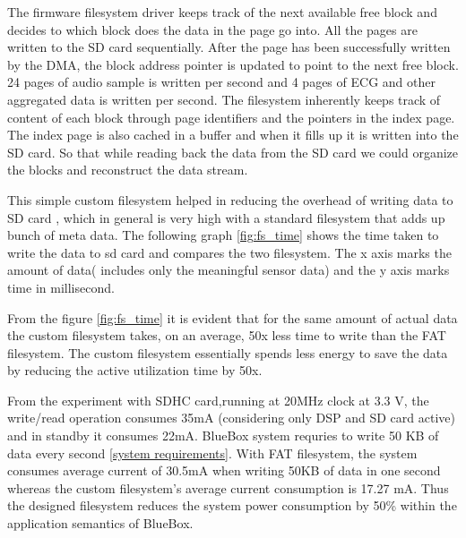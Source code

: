 The firmware filesystem driver keeps track of the next available free block and decides to which block does the data in the page go into. All the pages are written to the SD card sequentially. After the page has been successfully written by the DMA, the block address pointer is updated to point to the next free block.  24 pages of audio sample is written per second and 4 pages of ECG and other aggregated data is written per second.  
The filesystem inherently keeps track of content of each block through page identifiers and the pointers in the index page. The index page is also cached in a buffer and when it fills up it is written into the SD card. So that while reading back the data from the SD card we could organize the blocks and reconstruct the data stream.  

This simple custom filesystem  helped in reducing the overhead of writing data to SD card , which in general is very high with a standard filesystem that adds up bunch of meta data. The following graph \ref{fig:fs_time} shows the time taken to write the data to sd card and compares the two filesystem. The x axis marks the amount of data( includes only the meaningful sensor data)  and the y axis marks time in millisecond.
{
\centering
{}\label{fig:fs_time}

}

From the figure \ref{fig:fs_time} it is evident that for the same amount of actual data the custom filesystem takes, on an average, 50x less time to write than the FAT filesystem. The custom filesystem essentially spends less energy to save the data by reducing the active utilization time by 50x. 

From the experiment with SDHC card,running at 20MHz clock at 3.3 V,  the write/read operation consumes 35mA (considering only DSP and SD card active) and in standby it consumes 22mA. BlueBox system requries to write 50 KB of data every second \ref{system requirements}. With FAT filesystem, the system consumes average current of 30.5mA when writing 50KB of data in one second whereas the custom filesystem's average current consumption is 17.27 mA. Thus the designed filesystem reduces the system power consumption by 50\% within the application semantics of BlueBox. 